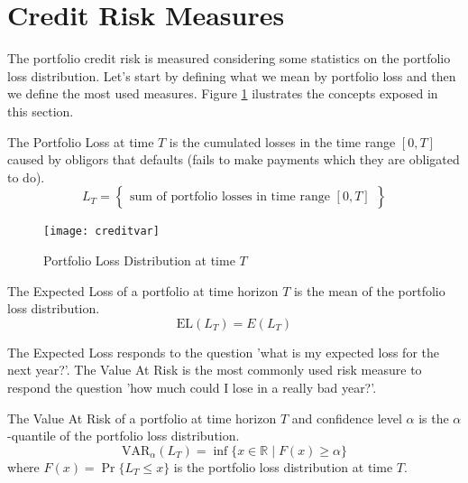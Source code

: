 \documentclass[11pt,fleqn]{book} %
\begin{document}

\section{Credit Risk Measures}

The portfolio credit risk is measured considering some statistics on 
the portfolio loss distribution. Let's start by defining what we mean 
by portfolio loss and then we define the most used measures. Figure 
\ref{fig:lossdistr} ilustrates the concepts exposed in this section.

\begin{definition}
	The Portfolio Loss at time $T$ is the cumulated losses in the time 
	range $[0,T]$ caused by obligors that defaults (fails to make 
	payments which they are obligated to do).
	\begin{displaymath}
		L_T = \left\{
		\begin{array}{c}
			\text{sum of portfolio losses in time range $[0,T]$}
		\end{array}
		\right\}
	\end{displaymath}
\end{definition}

\begin{figure}[ht]
	\centering
	\texttt{[image: creditvar]}
	\caption{Portfolio Loss Distribution at time $T$}
	\label{fig:lossdistr}
\end{figure}

\begin{definition}
	The Expected Loss of a portfolio at time horizon $T$ is the 
	mean of the portfolio loss distribution.
	\begin{displaymath}
		\text{EL}(L_T) = E(L_T)
	\end{displaymath}
\end{definition}

The Expected Loss responds to the question 'what is my expected loss for 
the next year?'. The Value At Risk \cite{var:jorion} is the most commonly 
used risk measure to respond the question 'how much could I lose in a really 
bad year?'.

\begin{definition}
	The Value At Risk of a portfolio at time horizon $T$ and 
	confidence level $\alpha$ is the $\alpha$-quantile of the portfolio loss 
	distribution.
	\begin{displaymath}
		\text{VAR}_\alpha(L_T) = \inf\{x \in \mathbb{R} \mid F(x) \ge \alpha \}
	\end{displaymath}
	where $F(x)=\Pr\{L_T \le x\}$ is the portfolio loss distribution at time $T$.
\end{definition}
\end{document}
